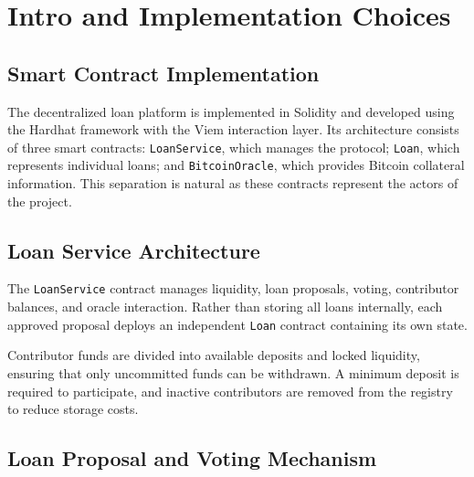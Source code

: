 
\chapter{Intro and Implementation Choices}
\label{Chapter1}
\setlength{\parindent}{0pt}


\newcommand{\keyword}[1]{\textbf{#1}}
\newcommand{\tabhead}[1]{\textbf{#1}}
\newcommand{\code}[1]{\texttt{#1}}
\newcommand{\file}[1]{\texttt{\bfseries#1}}
\newcommand{\option}[1]{\texttt{\itshape#1}}

\section{Smart Contract Implementation}

The decentralized loan platform is implemented in Solidity and developed using the Hardhat framework with the Viem interaction layer.
Its architecture consists of three smart contracts: \texttt{LoanService}, which manages the protocol; \texttt{Loan}, which represents individual loans; and \texttt{BitcoinOracle}, which provides Bitcoin collateral information. This separation is natural as these contracts represent the actors of the project.

\section{Loan Service Architecture}

The \texttt{LoanService} contract manages liquidity, loan proposals, voting, contributor balances, and oracle interaction. Rather than storing all loans internally, each approved proposal deploys an independent \texttt{Loan} contract containing its own state.

Contributor funds are divided into available deposits and locked liquidity, ensuring that only uncommitted funds can be withdrawn. A minimum deposit is required to participate, and inactive contributors are removed from the registry to reduce storage costs.

\section{Loan Proposal and Voting Mechanism}

